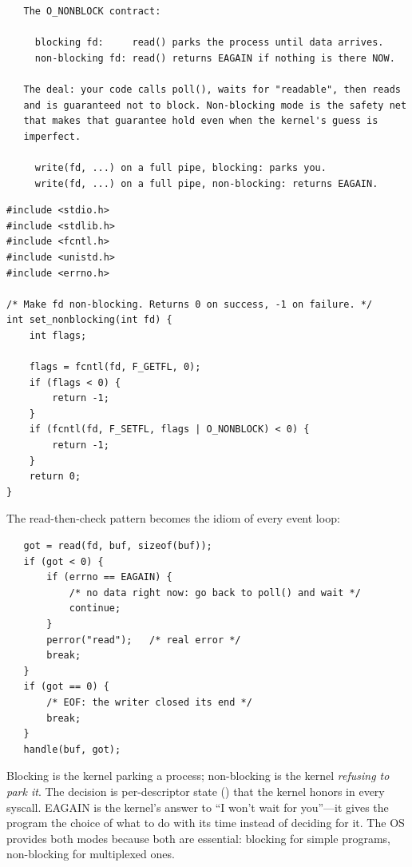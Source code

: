 \begin{verbatim}
   The O_NONBLOCK contract:

     blocking fd:     read() parks the process until data arrives.
     non-blocking fd: read() returns EAGAIN if nothing is there NOW.

   The deal: your code calls poll(), waits for "readable", then reads
   and is guaranteed not to block. Non-blocking mode is the safety net
   that makes that guarantee hold even when the kernel's guess is
   imperfect.

     write(fd, ...) on a full pipe, blocking: parks you.
     write(fd, ...) on a full pipe, non-blocking: returns EAGAIN.
\end{verbatim}

\begin{lstlisting}[caption={Turning a descriptor non-blocking.}]
#include <stdio.h>
#include <stdlib.h>
#include <fcntl.h>
#include <unistd.h>
#include <errno.h>

/* Make fd non-blocking. Returns 0 on success, -1 on failure. */
int set_nonblocking(int fd) {
    int flags;

    flags = fcntl(fd, F_GETFL, 0);
    if (flags < 0) {
        return -1;
    }
    if (fcntl(fd, F_SETFL, flags | O_NONBLOCK) < 0) {
        return -1;
    }
    return 0;
}
\end{lstlisting}

The read-then-check pattern becomes the idiom of every event loop:

\begin{verbatim}
   got = read(fd, buf, sizeof(buf));
   if (got < 0) {
       if (errno == EAGAIN) {
           /* no data right now: go back to poll() and wait */
           continue;
       }
       perror("read");   /* real error */
       break;
   }
   if (got == 0) {
       /* EOF: the writer closed its end */
       break;
   }
   handle(buf, got);
\end{verbatim}

\begin{osconcept}
Blocking is the kernel parking a process; non-blocking is the kernel
\emph{refusing to park it}. The decision is per-descriptor state
() that the kernel honors in every syscall. EAGAIN
is the kernel's answer to ``I won't wait for you''---it gives the
program the choice of what to do with its time instead of deciding
for it. The OS provides both modes because both are essential: blocking
for simple programs, non-blocking for multiplexed ones.
\end{osconcept}

